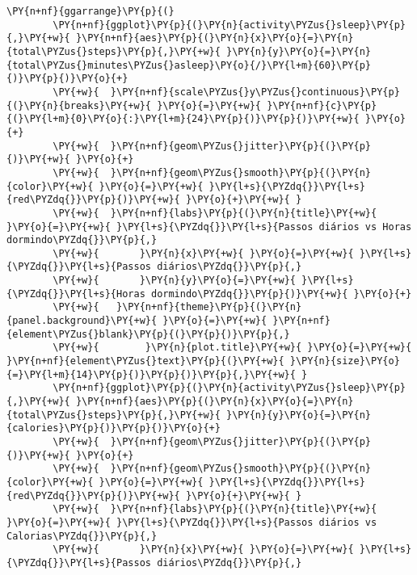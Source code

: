 \begin{tcolorbox}[breakable, size=fbox, boxrule=1pt, pad at break*=1mm,colback=cellbackground, colframe=cellborder]
    \begin{Verbatim}[commandchars=\\\{\}]
        \PY{n+nf}{ggarrange}\PY{p}{(}
        \PY{n+nf}{ggplot}\PY{p}{(}\PY{n}{activity\PYZus{}sleep}\PY{p}{,}\PY{+w}{ }\PY{n+nf}{aes}\PY{p}{(}\PY{n}{x}\PY{o}{=}\PY{n}{total\PYZus{}steps}\PY{p}{,}\PY{+w}{ }\PY{n}{y}\PY{o}{=}\PY{n}{total\PYZus{}minutes\PYZus{}asleep}\PY{o}{/}\PY{l+m}{60}\PY{p}{)}\PY{p}{)}\PY{o}{+}
        \PY{+w}{  }\PY{n+nf}{scale\PYZus{}y\PYZus{}continuous}\PY{p}{(}\PY{n}{breaks}\PY{+w}{ }\PY{o}{=}\PY{+w}{ }\PY{n+nf}{c}\PY{p}{(}\PY{l+m}{0}\PY{o}{:}\PY{l+m}{24}\PY{p}{)}\PY{p}{)}\PY{+w}{ }\PY{o}{+}
        \PY{+w}{  }\PY{n+nf}{geom\PYZus{}jitter}\PY{p}{(}\PY{p}{)}\PY{+w}{ }\PY{o}{+}
        \PY{+w}{  }\PY{n+nf}{geom\PYZus{}smooth}\PY{p}{(}\PY{n}{color}\PY{+w}{ }\PY{o}{=}\PY{+w}{ }\PY{l+s}{\PYZdq{}}\PY{l+s}{red\PYZdq{}}\PY{p}{)}\PY{+w}{ }\PY{o}{+}\PY{+w}{ }
        \PY{+w}{  }\PY{n+nf}{labs}\PY{p}{(}\PY{n}{title}\PY{+w}{ }\PY{o}{=}\PY{+w}{ }\PY{l+s}{\PYZdq{}}\PY{l+s}{Passos diários vs Horas dormindo\PYZdq{}}\PY{p}{,}
        \PY{+w}{       }\PY{n}{x}\PY{+w}{ }\PY{o}{=}\PY{+w}{ }\PY{l+s}{\PYZdq{}}\PY{l+s}{Passos diários\PYZdq{}}\PY{p}{,}
        \PY{+w}{       }\PY{n}{y}\PY{o}{=}\PY{+w}{ }\PY{l+s}{\PYZdq{}}\PY{l+s}{Horas dormindo\PYZdq{}}\PY{p}{)}\PY{+w}{ }\PY{o}{+}
        \PY{+w}{   }\PY{n+nf}{theme}\PY{p}{(}\PY{n}{panel.background}\PY{+w}{ }\PY{o}{=}\PY{+w}{ }\PY{n+nf}{element\PYZus{}blank}\PY{p}{(}\PY{p}{)}\PY{p}{,}
        \PY{+w}{        }\PY{n}{plot.title}\PY{+w}{ }\PY{o}{=}\PY{+w}{ }\PY{n+nf}{element\PYZus{}text}\PY{p}{(}\PY{+w}{ }\PY{n}{size}\PY{o}{=}\PY{l+m}{14}\PY{p}{)}\PY{p}{)}\PY{p}{,}\PY{+w}{ }
        \PY{n+nf}{ggplot}\PY{p}{(}\PY{n}{activity\PYZus{}sleep}\PY{p}{,}\PY{+w}{ }\PY{n+nf}{aes}\PY{p}{(}\PY{n}{x}\PY{o}{=}\PY{n}{total\PYZus{}steps}\PY{p}{,}\PY{+w}{ }\PY{n}{y}\PY{o}{=}\PY{n}{calories}\PY{p}{)}\PY{p}{)}\PY{o}{+}
        \PY{+w}{  }\PY{n+nf}{geom\PYZus{}jitter}\PY{p}{(}\PY{p}{)}\PY{+w}{ }\PY{o}{+}
        \PY{+w}{  }\PY{n+nf}{geom\PYZus{}smooth}\PY{p}{(}\PY{n}{color}\PY{+w}{ }\PY{o}{=}\PY{+w}{ }\PY{l+s}{\PYZdq{}}\PY{l+s}{red\PYZdq{}}\PY{p}{)}\PY{+w}{ }\PY{o}{+}\PY{+w}{ }
        \PY{+w}{  }\PY{n+nf}{labs}\PY{p}{(}\PY{n}{title}\PY{+w}{ }\PY{o}{=}\PY{+w}{ }\PY{l+s}{\PYZdq{}}\PY{l+s}{Passos diários vs Calorias\PYZdq{}}\PY{p}{,}
        \PY{+w}{       }\PY{n}{x}\PY{+w}{ }\PY{o}{=}\PY{+w}{ }\PY{l+s}{\PYZdq{}}\PY{l+s}{Passos diários\PYZdq{}}\PY{p}{,}

\end{Verbatim}
\end{tcolorbox}
